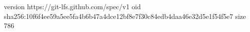 version https://git-lfs.github.com/spec/v1
oid sha256:10f6f4ee59a5ee5fa4b6b47a4dce12bf8e7f30c84edb4daa46e32d5e1f54f5e7
size 786
